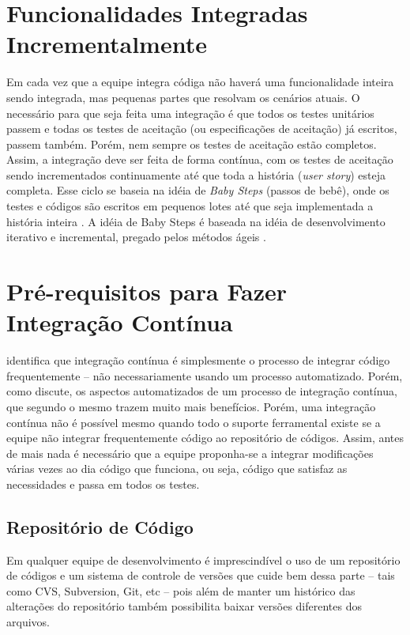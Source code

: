 \documentclass[10pt,a4paper,font=plain]{abnt}
\begin{document}
\section{Funcionalidades Integradas Incrementalmente}

Em cada vez que a equipe integra códiga não haverá uma funcionalidade inteira sendo integrada, mas pequenas partes que resolvam os cenários atuais. O necessário para que seja feita uma integração é que todos os testes unitários passem e todas os testes de aceitação (ou especificações de aceitação) já escritos, passem também. Porém, nem sempre os testes de aceitação estão completos. Assim, a integração deve ser feita de forma contínua, com os testes de aceitação sendo  incrementados continuamente até que toda a história (\textit{user story}) esteja completa. Esse ciclo se baseia na idéia de \textit{Baby Steps} (passos de bebê), onde os testes e códigos são escritos em pequenos lotes até que seja implementada a história inteira \cite{BabySteps}. A idéia de Baby Steps é baseada na idéia de desenvolvimento iterativo e incremental, pregado pelos métodos ágeis \cite{XP.org}.



\section{Pré-requisitos para Fazer Integração Contínua}

 identifica que integração contínua é simplesmente o processo de integrar código frequentemente -- não necessariamente usando um processo automatizado. Porém, como  discute, os aspectos automatizados de um processo de integração contínua, que segundo o mesmo trazem muito mais benefícios.
Porém, uma integração contínua não é possível mesmo quando todo o suporte ferramental existe se a equipe não integrar frequentemente código ao repositório de códigos. Assim, antes de mais nada é necessário que a equipe proponha-se a integrar modificações várias vezes ao dia código que funciona, ou seja, código que satisfaz as necessidades e passa em todos os testes.


\subsection{Repositório de Código}

Em qualquer equipe de desenvolvimento é imprescindível o uso de um repositório de códigos e um sistema de controle de versões que cuide bem dessa parte -- tais como CVS, Subversion, Git, etc -- pois além de manter um histórico das alterações do repositório também possibilita baixar versões diferentes dos arquivos.
\end{document}
